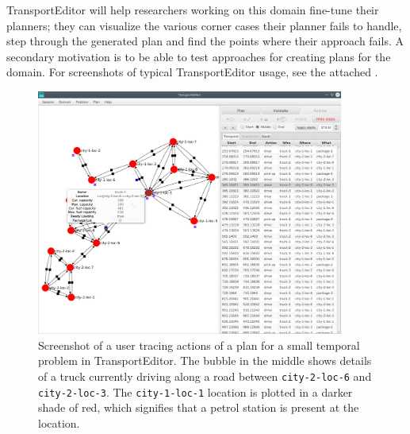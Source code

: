 TransportEditor will help researchers working on this domain fine-tune their planners; they can visualize the various corner cases their planner fails to handle, step through the generated plan and find the points where their approach fails.
A secondary motivation is to be able to test approaches for creating plans for the domain.
For screenshots of typical TransportEditor usage, see the attached .

\begin{figure}[t]
\begin{center}
\includegraphics[width=0.9\textwidth]{../img/transporteditor_temporal}
\end{center}
\caption[Screenshot of a user tracing actions of a plan for a small temporal problem in TransportEditor.]{Screenshot of a user tracing actions of a plan for a small temporal problem in TransportEditor. The bubble in the middle shows details
of a truck currently driving along a road between \texttt{city-2-loc-6} and \texttt{city-2-loc-3}. The \texttt{city-1-loc-1} location is plotted in a darker shade of red, which signifies that a petrol station is present at the location.}
\label{fig:transporteditor-screenshot}
\end{figure}

